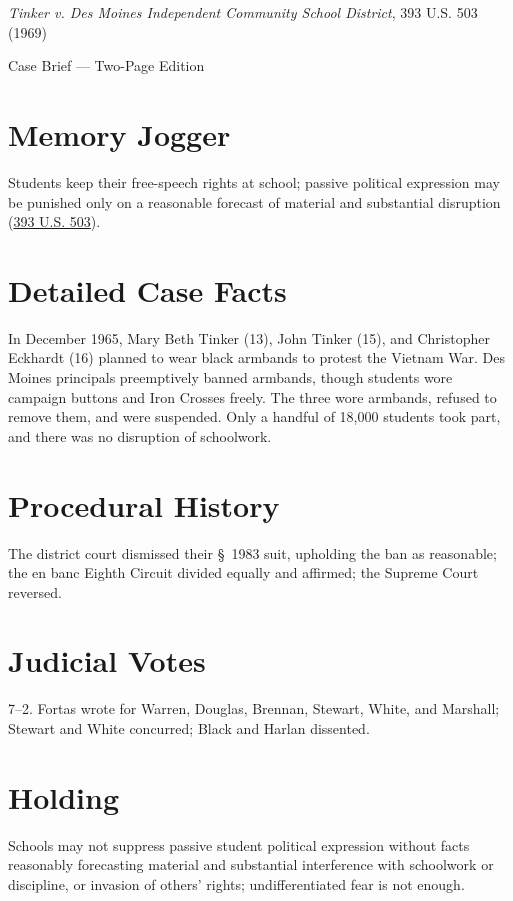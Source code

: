 \documentclass[12pt]{article}
\begin{document}
\begin{center}
{\LARGE \textit{Tinker v. Des Moines Independent Community School District}, 393 U.S. 503 (1969)\par}
\vspace{0.5em}
{\large Case Brief --- Two-Page Edition\par}
\end{center}

\section{Memory Jogger}
Students keep their free-speech rights at school; passive political expression may be punished only on a reasonable forecast of material and substantial disruption (\href{https://supreme.justia.com/cases/federal/us/393/503/}{393 U.S. 503}).

\section{Detailed Case Facts}
In December 1965, Mary Beth Tinker (13), John Tinker (15), and Christopher Eckhardt (16) planned to wear black armbands to protest the Vietnam War. Des Moines principals preemptively banned armbands, though students wore campaign buttons and Iron Crosses freely. The three wore armbands, refused to remove them, and were suspended. Only a handful of 18,000 students took part, and there was no disruption of schoolwork.

\section{Procedural History}
The district court dismissed their \S~1983 suit, upholding the ban as reasonable; the en banc Eighth Circuit divided equally and affirmed; the Supreme Court reversed.

\section{Judicial Votes}
7--2. Fortas wrote for Warren, Douglas, Brennan, Stewart, White, and Marshall; Stewart and White concurred; Black and Harlan dissented.

\section{Holding}
Schools may not suppress passive student political expression without facts reasonably forecasting material and substantial interference with schoolwork or discipline, or invasion of others' rights; undifferentiated fear is not enough.
\end{document}
